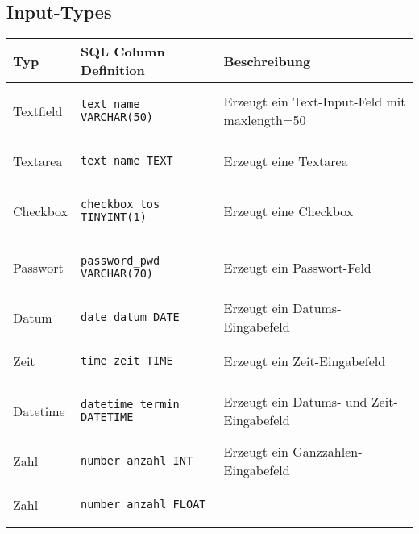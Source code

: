 \documentclass[11pt,a4paper,titlepage,portrait,ngerman]{scrartcl}
\begin{document}
\subsection{Input-Types}
\small{
\begin{tabular}{|p{2cm}|l|p{5.2cm}|}
		\hline
		{\textbf{Typ}} 
		& 
		{\textbf{SQL Column Definition}}
		& 
		{\textbf{Beschreibung}}  \\
	\hline
		{Textfield} 
		& 
		\begin{lstlisting} 
text_name VARCHAR(50)
		\end{lstlisting} 
		& 
		{Erzeugt ein Text-Input-Feld mit maxlength=50}  \\
	\hline 
		{Textarea} 
		& 
		\begin{lstlisting} 
text_name TEXT
		\end{lstlisting} 
		& 
		{Erzeugt eine Textarea}  \\
	\hline
		{Checkbox} 
		& 
		\begin{lstlisting} 
checkbox_tos TINYINT(1)
		\end{lstlisting} 
		& 
		{Erzeugt eine Checkbox}  \\
	\hline
		{Passwort} 
		& 
		\begin{lstlisting} 
password_pwd VARCHAR(70)
		\end{lstlisting} 
		& 
		{Erzeugt ein Passwort-Feld}  \\
	\hline
		{Datum} 
		& 
		\begin{lstlisting} 
date_datum DATE
		\end{lstlisting} 
		& 
		{Erzeugt ein Datums-Eingabefeld}  \\
	\hline
		{Zeit} 
		& 
		\begin{lstlisting} 
time_zeit TIME
		\end{lstlisting} 
		& 
		{Erzeugt ein Zeit-Eingabefeld}  \\
	\hline
		{Datetime} 
		& 
		\begin{lstlisting} 
datetime_termin DATETIME
		\end{lstlisting} 
		& 
		{Erzeugt ein Datums- und Zeit-Eingabefeld}  \\
	\hline
		{Zahl} 
		& 
		\begin{lstlisting} 
number_anzahl INT
		\end{lstlisting} 
		& 
		{Erzeugt ein Ganzzahlen-Eingabefeld}  \\
	\hline
		{Zahl} 
		& 
		\begin{lstlisting} 
number_anzahl FLOAT
		\end{lstlisting} 
		& 

\end{tabular}}
\end{document}
